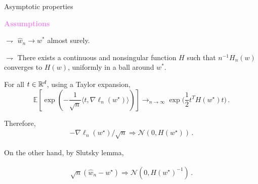 \documentclass[xcolor={usenames,dvipsnames},handout]{beamer}
\begin{document}
\begin{frame}{Asymptotic properties}


{\bf\textcolor{violet}{Assumptions}}

$\rightharpoondown$ \alert{$\widehat w_n\to w^*$ almost surely}. 

$\rightharpoondown$ There exists a continuous and nonsingular function $H$ such that \alert{$n^{-1}H_{n}(w)$ converges to $H(w)$}, uniformly in a ball around $w^*$.

\vspace{.5cm}

For all $t\in\mathbb{R}^d$, using a Taylor expansion,
\[
\mathbb{E} \left[ \exp\left( - \frac{1}{\sqrt{n}} \langle t, \nabla \ell_n(w^{\star}) \rangle \right) \right] \to_{n\to \infty}  \exp\Bigg( \frac{1}{2} t^T H(w^{\star}) t \Bigg)\,.
\]

Therefore, 
\begin{align*}
-\nabla \ell_n(w^{\star}) / \sqrt{n} \Rightarrow \mathcal{N}(0, H(w^{\star}))\,.
\end{align*}

\vspace{.5cm}

On the other hand, by \alert{Slutsky lemma}, 

\begin{align*}
\sqrt{n} (\widehat{w}_n - w^{\star}) \Rightarrow \mathcal{N}(0,  H(w^{\star})^{-1})\,.
\end{align*}

\end{frame}
\end{document}
